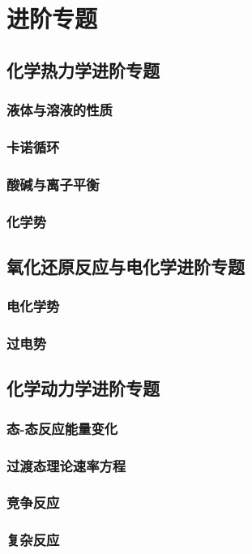 \section{进阶专题}
\subsection{化学热力学进阶专题}
\subsubsection{液体与溶液的性质}
\subsubsection{卡诺循环}
\subsubsection{酸碱与离子平衡}
\subsubsection{化学势}

\newpage
\subsection{氧化还原反应与电化学进阶专题}
\subsubsection{电化学势}
\subsubsection{过电势}

\newpage
\subsection{化学动力学进阶专题}
\subsubsection{态-态反应能量变化}
\subsubsection{过渡态理论速率方程}
\subsubsection{竞争反应}
\subsubsection{复杂反应}

